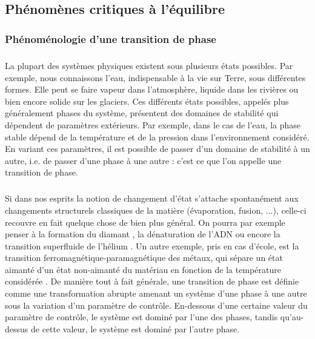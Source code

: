 \subsection{Phénomènes critiques à l'équilibre}

\subsubsection{Phénoménologie d'une transition de phase}

\subparagraph{}La plupart des systèmes physiques existent sous plusieurs états possibles. Par exemple, nous connaissons l'eau, indispensable à la vie sur Terre, sous différentes formes. Elle peut se faire vapeur dans l'atmosphère, liquide dans les rivières ou bien encore solide sur les glaciers. Ces différents états possibles, appelés plus généralement phases du système, présentent des domaines de stabilité qui dépendent de paramètres extérieurs. Par exemple, dans le cas de l'eau, la phase stable dépend de la température et de la pression dans l'environnement considéré. En variant ces paramètres, il est possible de passer d'un domaine de stabilité à un autre, i.e. de passer d'une phase à une autre : c'est ce que l'on appelle une transition de phase.

\subparagraph{}Si dans nos esprits la notion de changement d'état s'attache spontanément aux changements structurels classiques de la matière (évaporation, fusion, ...), celle-ci recouvre en fait quelque chose de bien plus général. On pourra par exemple penser à la formation du diamant \cite{xie_mechanism_2014}, la dénaturation de l'ADN \cite{theodorakopoulos_order_2000} ou encore la transition superfluide de l'hélium \cite{bishop_study_1980}. Un autre exemple, pris en cas d'école, est la transition ferromagnétique-paramagnétique des métaux, qui sépare un état aimanté d'un état non-aimanté du matériau en fonction de la température considérée \cite{kardar_statistical_2007}. De manière tout à fait générale, une transition de phase est définie comme une transformation abrupte amenant un système d'une phase à une autre sous la variation d'un paramètre de contrôle. En-dessous d'une certaine valeur du paramètre de contrôle, le système est dominé par l'une des phases, tandis qu'au-dessus de cette valeur, le système est dominé par l'autre phase. 


